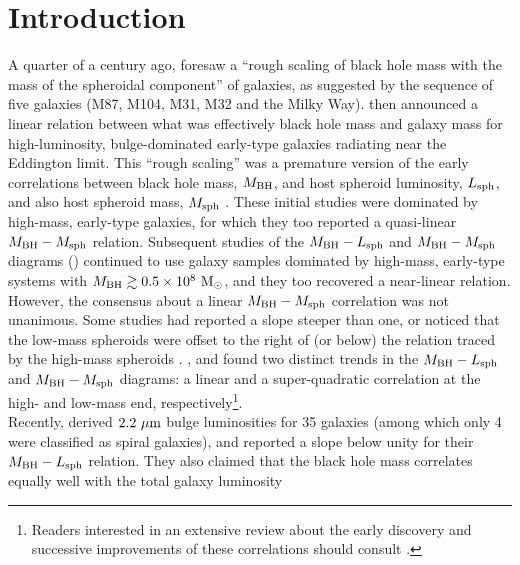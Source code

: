 \documentclass[preprint2]{emulateapj}
\begin{document}
\section{Introduction}
\label{sec:int}
A quarter of a century ago, 
\cite{dressler1989} foresaw a ``rough scaling of black hole mass with the mass of the spheroidal component'' of galaxies, 
as suggested by the sequence of five galaxies (M87, M104, M31, M32 and the Milky Way). 
\cite{yee1992} then announced a linear relation between what was effectively black hole mass and galaxy mass for high-luminosity, bulge-dominated early-type galaxies 
radiating near the Eddington limit.
This ``rough scaling'' was a premature version of the early correlations between black hole mass, $M_{\rm BH}$,  
and host spheroid luminosity, $L_{\rm sph}$, and also host spheroid mass, $M_{\rm sph}$ 
\citep{kormendyrichstone1995,magorrian1998,marconihunt2003,haringrix2004}. 
These initial studies were dominated by high-mass, early-type galaxies, 
for which they too reported a quasi-linear $M_{\rm BH} - M_{\rm sph}$ relation. 
Subsequent studies of the $M_{\rm BH} - L_{\rm sph}$ and $M_{\rm BH} - M_{\rm sph}$ diagrams 
(\citealt{ferrareseford2005,lauer2007,graham2007,gultelkin2009,sani2011,beifiori2012,erwingadotti2012,
vika2012,vandenbosch2012,mcconnellma2013,kormendyho2013})
continued to use galaxy samples dominated by high-mass, early-type systems with $M_{\rm BH} \gtrsim 0.5 \times 10^8~\rm M_\odot$, 
and they too recovered a near-linear relation. 
However, the consensus about a linear $M_{\rm BH} - M_{\rm sph}$ correlation was not unanimous. 
Some studies had reported a slope steeper than one,  
or noticed that the low-mass spheroids were offset to the right of (or below) the relation traced by the high-mass spheroids 
\citep{laor1998,wandel1999,laor2001,ryan2007}.
\cite{graham2012bent}, \cite{grahamscott2013} and \cite{scott2013} found two distinct trends in the $M_{\rm BH} - L_{\rm sph}$ and $M_{\rm BH} - M_{\rm sph}$ diagrams:  
a linear and a super-quadratic correlation at the high- and low-mass end, respectively\footnote{Readers 
interested in an extensive review about the early discovery and successive improvements of these correlations 
should consult \cite{graham2015bulges}.}. \\
Recently, \cite{lasker2014data,lasker2014anal} derived $2.2~\rm \mu m$ bulge luminosities for 35 galaxies 
(among which only 4 were classified as spiral galaxies), 
and reported a slope below unity for their $M_{\rm BH} - L_{\rm sph}$ relation. 
They also claimed that the black hole mass correlates equally well with the total galaxy luminosity 
\end{document}
